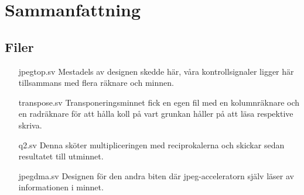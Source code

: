 \documentclass[a4paper]{article}
\begin{document}
%
%
%
%
%
%
%
%
%
%



\section{Sammanfattning}



\subsection{Filer}
\begin{itemize}
	\item [jpegtop.sv] Mestadels av designen skedde här, våra kontrollsignaler ligger här tillsammans med flera räknare och minnen.
	\item [transpose.sv] Transponeringsminnet fick en egen fil med en kolumnräknare och en radräknare för att hålla koll på vart grunkan håller på att läsa respektive skriva.
	\item [q2.sv] Denna sköter multipliceringen med reciprokalerna och skickar sedan resultatet till utminnet.
	\item [jpegdma.sv] Designen för den andra biten där jpeg-acceleratorn själv läser av informationen i minnet.
\end{itemize}
\end{document}
